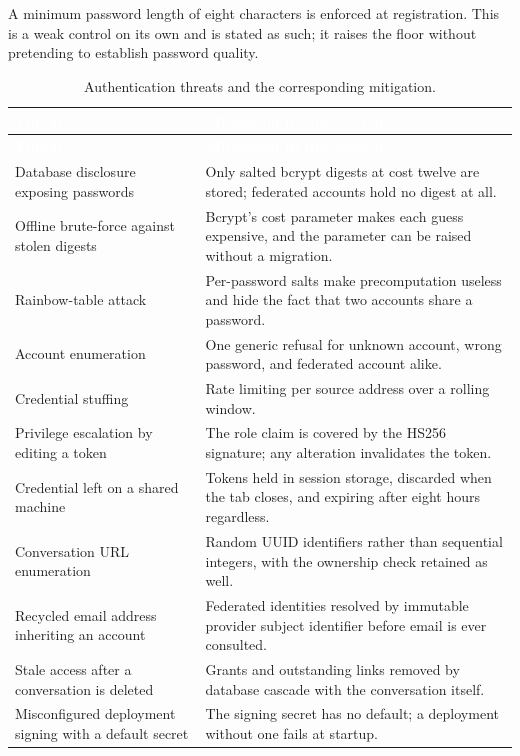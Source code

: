 A minimum password length of eight characters is enforced at registration. This is a weak
control on its own and is stated as such; it raises the floor without pretending to establish
password quality.

\begin{longtable}{|p{}|p{}|}
\caption{Authentication threats and the corresponding mitigation.}\label{tab:threatmodel}\\
\hline
\rowcolor{myblue}\textcolor{white}{\textbf{Threat}} & \textcolor{white}{\textbf{Mitigation in this system}} \\
\hline
\endfirsthead
\hline
\rowcolor{myblue}\textcolor{white}{\textbf{Threat}} & \textcolor{white}{\textbf{Mitigation in this system}} \\
\hline
\endhead
Database disclosure exposing passwords & Only salted bcrypt digests at cost twelve are stored; federated accounts hold no digest at all. \\ \hline
Offline brute-force against stolen digests & Bcrypt's cost parameter makes each guess expensive, and the parameter can be raised without a migration. \\ \hline
Rainbow-table attack & Per-password salts make precomputation useless and hide the fact that two accounts share a password. \\ \hline
Account enumeration & One generic refusal for unknown account, wrong password, and federated account alike. \\ \hline
Credential stuffing & Rate limiting per source address over a rolling window. \\ \hline
Privilege escalation by editing a token & The role claim is covered by the HS256 signature; any alteration invalidates the token. \\ \hline
Credential left on a shared machine & Tokens held in session storage, discarded when the tab closes, and expiring after eight hours regardless. \\ \hline
Conversation URL enumeration & Random UUID identifiers rather than sequential integers, with the ownership check retained as well. \\ \hline
Recycled email address inheriting an account & Federated identities resolved by immutable provider subject identifier before email is ever consulted. \\ \hline
Stale access after a conversation is deleted & Grants and outstanding links removed by database cascade with the conversation itself. \\ \hline
Misconfigured deployment signing with a default secret & The signing secret has no default; a deployment without one fails at startup. \\ \hline
\end{longtable}

